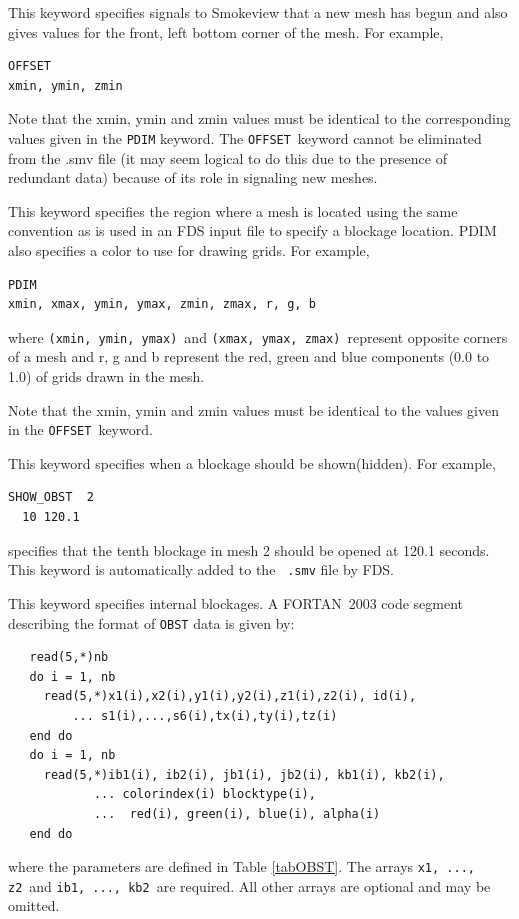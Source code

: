 \documentclass[11pt,twoside]{book}
\newcommand{\hitem}[1]{\item[{\bf #1} \hfill]}
\begin{document}
\hitem{OFFSET}This keyword specifies signals to Smokeview that a new mesh has begun and also
gives values for the front, left bottom corner of the mesh.  For example,
\begin{lstlisting}
OFFSET
xmin, ymin, zmin
\end{lstlisting}

Note that the xmin, ymin and zmin values must be identical to the corresponding values given in
the {\tt PDIM} keyword. The {\tt OFFSET}\ keyword cannot be eliminated from the .smv file
(it may seem logical to do this due
to the presence of redundant data) because of its role in signaling new meshes.

\hitem{PDIM}This keyword specifies the region where a mesh is located
using the same convention as is used in an FDS input file to specify a blockage location.
PDIM also specifies a color to use for drawing grids.  For example,
\begin{lstlisting}
PDIM
xmin, xmax, ymin, ymax, zmin, zmax, r, g, b
\end{lstlisting}
where {\tt (xmin,~ymin,~ymax)}\ and {\tt (xmax,~ymax,~zmax)}\
represent opposite corners of a mesh
and r, g and b represent the red, green and blue components (0.0 to 1.0) of grids drawn
in the mesh.

Note that the xmin, ymin and zmin values must be identical to the values given in the
{\tt OFFSET}\ keyword.


\hitem{SHOW\_OBST(HIDE\_OBST)} This keyword specifies when a
blockage should be shown(hidden). For example,
\begin{lstlisting}
SHOW_OBST  2
  10 120.1
\end{lstlisting}
specifies that the tenth blockage in mesh 2 should be opened at
120.1 seconds.  This keyword is automatically added to the {\tt
.smv} file by FDS.

\hitem{OBST}This keyword specifies internal blockages. A
FORTAN~2003 code segment describing the format of {\tt OBST} data
is given by:
\begin{lstlisting}
   read(5,*)nb
   do i = 1, nb
     read(5,*)x1(i),x2(i),y1(i),y2(i),z1(i),z2(i), id(i),
         ... s1(i),...,s6(i),tx(i),ty(i),tz(i)
   end do
   do i = 1, nb
     read(5,*)ib1(i), ib2(i), jb1(i), jb2(i), kb1(i), kb2(i),
            ... colorindex(i) blocktype(i),
            ...  red(i), green(i), blue(i), alpha(i)
   end do
\end{lstlisting}
where the parameters are defined in Table \ref{tabOBST}.
The arrays {\tt x1, ..., z2}\ and {\tt ib1, ..., kb2}\ are
required. All other arrays are optional and may be omitted.
\end{document}

